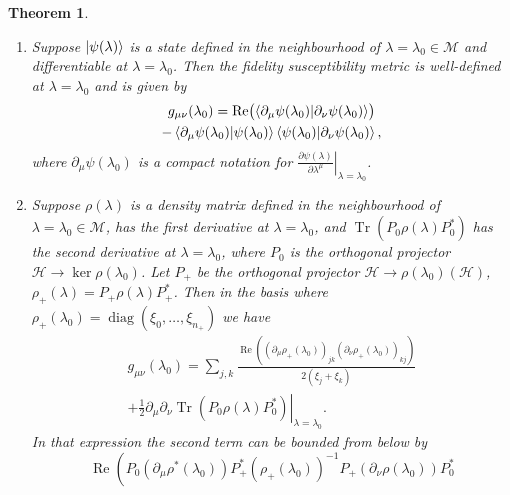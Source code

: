 \documentclass[
  american,aps,pra,reprint,floatfix,nofootinbib,superscriptaddress
]{revtex4-2}
\DeclareMathOperator{\Tr}{Tr}
\DeclareMathOperator{\real}{Re}
\DeclareMathOperator{\diag}{diag}
\newtheorem{theorem}{Theorem}
\begin{document}
\begin{theorem}
  \label{th:def.g}
  \begin{enumerate}
    \item Suppose $\ket{\psi(\lambda)}$ is a state defined in the
      neighbourhood of
      $\lambda = \lambda_0 \in \mathcal{M}$ and differentiable at
      $\lambda=\lambda_0$.  Then the fidelity susceptibility metric
      is well-defined at
      $\lambda=\lambda_0$ and is given by
      \begin{multline}
        \label{eq:gmunu.pure}
        g_{\mu\nu}(\lambda_0) = \real\bigl(\braket{\partial_\mu \psi(\lambda_0)
          | \partial_\nu \psi(\lambda_0)}\bigr)\\
        - \braket{\partial_\mu \psi(\lambda_0) | \psi(\lambda_0)}
          \braket{\psi(\lambda_0) | \partial_\nu \psi(\lambda_0)},
      \end{multline}
      where $\partial_\mu \psi(\lambda_0)$ is a compact notation for
      $\left.\frac{\partial \psi(\lambda)}{\partial \lambda^\mu}
      \right|_{\lambda=\lambda_0}$.
    \item Suppose $\rho(\lambda)$ is a density matrix defined in the
      neighbourhood of $\lambda = \lambda_0 \in \mathcal{M}$, has the first
      derivative at $\lambda = \lambda_0$, and $\Tr(P_0 \rho(\lambda) P_0^*)$
      has the second derivative
      at $\lambda = \lambda_0$, where $P_0$ is the orthogonal
      projector $\mathcal{H} \to \ker\rho(\lambda_0)$.
      Let $P_{{+}}$ be the orthogonal projector
      $\mathcal{H} \to \rho(\lambda_0)(\mathcal{H})$,
      $\rho_{+}(\lambda) = P_{{+}} \rho(\lambda) P_{{+}}^*$.
      Then in the basis where
      $\rho_{+}(\lambda_0) = \diag(\xi_0,\dots,\xi_{n_{+}})$
      we have
      \begin{multline}
        g_{\mu\nu}(\lambda_0)
        = \sum_{j,k} \frac{
            \real\left(
              (\partial_\mu\rho_{+}(\lambda_0))_{jk}
              (\partial_\nu\rho_{+}(\lambda_0))_{kj}
            \right)
          }{2(\xi_j + \xi_k)}\\
        + \frac12 \left.\partial_\mu \partial_\nu \Tr(P_0 \rho(\lambda) P_0^*)
          \right|_{\lambda=\lambda_0}.
      \end{multline}
      In that expression the second term can be bounded from below by
      \begin{equation}
        \label{eq:g2bound}
        \real\left(
          P_0 \left(\partial_\mu\rho^*(\lambda_0)\right)
          P_{+}^* \left(\rho_{+}(\lambda_0)\right)^{-1}
          P_{+} \left(\partial_\nu\rho(\lambda_0)\right) P_0^*

\end{equation}
\end{enumerate}
\end{theorem}
\end{document}
